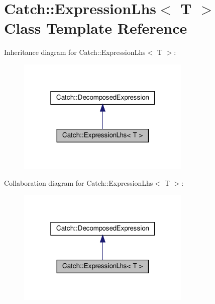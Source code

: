 \hypertarget{classCatch_1_1ExpressionLhs}{}\section{Catch\+:\+:Expression\+Lhs$<$ T $>$ Class Template Reference}
\label{classCatch_1_1ExpressionLhs}


Inheritance diagram for Catch\+:\+:Expression\+Lhs$<$ T $>$\+:
\nopagebreak
\begin{figure}[H]
\begin{center}
\leavevmode
\includegraphics[width=235pt]{classCatch_1_1ExpressionLhs__inherit__graph}
\end{center}
\end{figure}


Collaboration diagram for Catch\+:\+:Expression\+Lhs$<$ T $>$\+:
\nopagebreak
\begin{figure}[H]
\begin{center}
\leavevmode
\includegraphics[width=235pt]{classCatch_1_1ExpressionLhs__coll__graph}
\end{center}
\end{figure}
